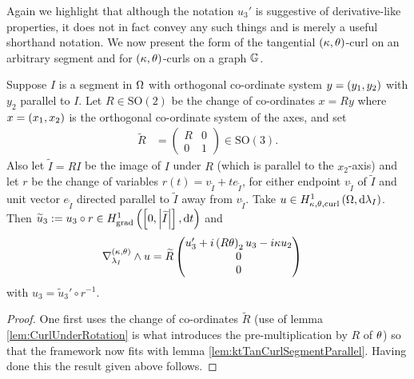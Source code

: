 Again we highlight that although the notation $u_3'$ is suggestive of derivative-like properties, it does not in fact convey any such things and is merely a useful shorthand notation.
We now present the form of the tangential $\left( \kappa, \theta \right)$-curl on an arbitrary segment and for $\left( \kappa, \theta \right)$-curls on a graph $\mathbb{G}$.
\begin{lemma} \label{ktTanCurlGeneralSegment}
	Suppose $I$ is a segment in $\Omega$ with orthogonal co-ordinate system $y=\left( y_1,y_2 \right)$ with $y_2$ parallel to $I$.
	Let $R\in\mathrm{SO}(2)$ be the change of co-ordinates $x=Ry$ where $x=\left( x_1,x_2 \right)$ is the orthogonal co-ordinate system of the axes, and set
	\begin{align*}
		\widetilde{R} &= \begin{pmatrix} R & 0 \\ 0 & 1 \end{pmatrix} \in \mathrm{SO}(3).
	\end{align*}
	Also let $\widetilde{I} = RI$ be the image of $I$ under $R$ (which is parallel to the $x_2$-axis) and let $r$ be the change of variables $r(t) = v_{\widetilde{I}} + te_{\widetilde{I}}$, for either endpoint $v_{\widetilde{I}}$ of $\widetilde{I}$ and unit vector $e_{\widetilde{I}}$ directed parallel to $\widetilde{I}$ away from $v_{\widetilde{I}}$.
	Take $u\in H^1_{\kappa,\theta,\mathrm{curl}}\left( \Omega, \mathrm{d}\lambda_I \right)$.
	Then $\widetilde{u}_3 := u_3 \circ r\in H^1_\mathrm{grad}\left( \left[ 0,\left\lvert \widetilde{I} \right\rvert \right], \mathrm{d}t \right)$ and
	\begin{align*}
		\nabla_{\lambda_I}^{\left( \kappa, \theta \right)}\wedge u &= \widetilde{R} \begin{pmatrix} u_3' + i\left( R\theta \right)_2u_3 - i\kappa u_2 \\ 0 \\ 0 \end{pmatrix}
	\end{align*}
	with $u_3 = \widetilde{u}_3' \circ r^{-1}$.
\end{lemma}
\begin{proof}
	One first uses the change of co-ordinates $\widetilde{R}$ (use of lemma  \ref{lem:CurlUnderRotation} is what introduces the pre-multiplication by $R$ of $\theta$) so that the framework now fits with lemma \ref{lem:ktTanCurlSegmentParallel}.
	Having done this the result given above follows.
\end{proof}


